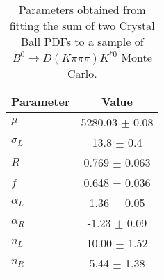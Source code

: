 \begin{table}[h]
  \centering
  \begin{tabular}{lc}
      \toprule
      Parameter & Value \\
      \midrule
      $\mu$ & 5280.03 $\pm$ 0.08 \\
      $\sigma_L$ & 13.8 $\pm$ 0.4 \\
      $R$ & 0.769 $\pm$ 0.063 \\
      $f$ & 0.648 $\pm$ 0.036 \\
      $\alpha_L$ & 1.36 $\pm$ 0.05 \\
      $\alpha_R$ & -1.23 $\pm$ 0.09 \\
      $n_L$ & 10.00 $\pm$ 1.52 \\
      $n_R$ & 5.44 $\pm$ 1.38 \\
  \bottomrule
  \end{tabular}
  \caption{Parameters obtained from fitting the sum of two Crystal Ball PDFs to a sample of $B^0 \to D(K\pi\pi\pi)K^{*0}$ Monte Carlo.}
\label{tab:signal_Kpipipi_MC_params}
\end{table}
